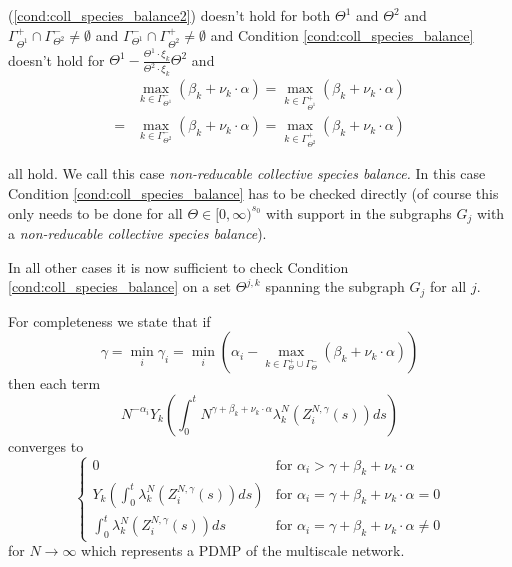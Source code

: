 \documentclass[english]{article}
\begin{document}
(\ref{cond:coll_species_balance2}) doesn't hold for both $\Theta^{1}$
and $\Theta^{2}$ and
$\Gamma_{\Theta^{1}}^{+} \cap \Gamma_{\Theta^{2}}^{-} \neq \emptyset$
and
$\Gamma_{\Theta^{1}}^{-} \cap \Gamma_{\Theta^{2}}^{+} \neq \emptyset$
and Condition \ref{cond:coll_species_balance} doesn't hold for
$\Theta^{1} - \frac{\Theta^{1} \cdot \xi_{k}}
	{\Theta^{2} \cdot \xi_{k}} \Theta^{2}$
and
\begin{align*}
	 & \underset{k \in \Gamma_{\Theta^{1}}^{-}}{\max} \left(
		\beta_{k} + \nu_{k} \cdot \alpha
	\right)
	= \underset{k \in \Gamma_{\Theta^{1}}^{+}}{\max} \left(
		\beta_{k} + \nu_{k} \cdot \alpha
	\right) \\
	= & \underset{k \in \Gamma_{\Theta^{2}}^{-}}{\max} \left(
		\beta_{k} + \nu_{k} \cdot \alpha
	\right)
	= \underset{k \in \Gamma_{\Theta^{2}}^{+}}{\max} \left(
		\beta_{k} + \nu_{k} \cdot \alpha
	\right)
\end{align*}


all hold. We call this case \emph{non-reducable collective species
balance.} In this case Condition \ref{cond:coll_species_balance}
has to be checked directly (of course this only needs to be done for
all $\Theta \in[0, \infty)^{s_{0}}$ with support in the subgraphs
$G_{j}$ with a \emph{non-reducable collective species balance}).

In all other cases it is now sufficient to check Condition
\ref{cond:coll_species_balance}
on a set $\Theta^{j, k}$ spanning the subgraph $G_{j}$ for all $j$.

\begin{theorem}
For completeness we state that if
\[
	\gamma = \underset{i}{\min} \gamma_{i}
	= \underset{i}{\min} \left(
		\alpha_{i} - \underset{
			k \in \Gamma_{\Theta}^{+} \cup \Gamma_{\Theta}^{-}
		}{\max} \left( \beta_{k} + \nu_{k} \cdot \alpha \right)
	\right)
\]
then each term
\[
	N^{-\alpha_{i}} Y_{k} \left(
		\int_{0}^{t} N^{\gamma + \beta_{k} + \nu_{k} \cdot \alpha}
		\lambda_{k}^{N} \left(
			Z_{i}^{N, \gamma} \left( s \right)
		\right) ds
	\right)
\]
converges to
\[
\begin{cases}
    0 & \mbox{for }
			\alpha_{i} > \gamma + \beta_{k} + \nu_{k} \cdot \alpha \\
    Y_{k} \left( \int_{0}^{t} \lambda_{k}^{N} \left(
			Z_{i}^{N, \gamma}\left( s \right) \right) ds
		\right) & \mbox{for } \alpha_{i}
		= \gamma + \beta_{k} + \nu_{k} \cdot \alpha = 0 \\
    \int_{0}^{t} \lambda_{k}^{N} \left(
			Z_{i}^{N, \gamma}\left( s \right)
		\right) ds & \mbox{for }
			\alpha_{i} = \gamma + \beta_{k} + \nu_{k} \cdot \alpha
            \neq 0
\end{cases}
\]
for $N \rightarrow \infty$ which represents a PDMP of the
multiscale network.
\end{theorem}
\end{document}

